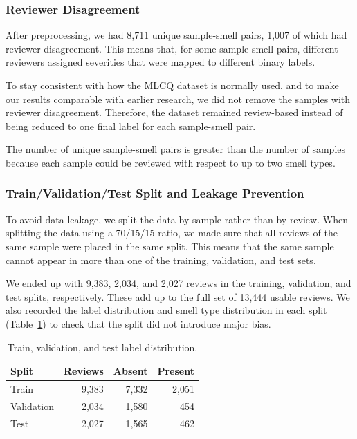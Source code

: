 \subsubsection{Reviewer Disagreement}

After preprocessing, we had 8,711 unique sample-smell pairs, 1,007 of which had reviewer disagreement. This means that, for some sample-smell pairs, different reviewers assigned severities that were mapped to different binary labels.

To stay consistent with how the MLCQ dataset is normally used, and to make our results comparable with earlier research, we did not remove the samples with reviewer disagreement. Therefore, the dataset remained review-based instead of being reduced to one final label for each sample-smell pair.

The number of unique sample-smell pairs is greater than the number of samples because each sample could be reviewed with respect to up to two smell types.

\subsubsection{Train/Validation/Test Split and Leakage Prevention}

To avoid data leakage, we split the data by sample rather than by review. When splitting the data using a 70/15/15 ratio, we made sure that all reviews of the same sample were placed in the same split. This means that the same sample cannot appear in more than one of the training, validation, and test sets.

We ended up with 9,383, 2,034, and 2,027 reviews in the training, validation, and test splits, respectively. These add up to the full set of 13,444 usable reviews. We also recorded the label distribution and smell type distribution in each split (Table~\ref{tab:split-distribution}) to check that the split did not introduce major bias.

\begin{table}[t]
\caption{Train, validation, and test label distribution.}
\label{tab:split-distribution}
\centering
\begin{tabular}{lrrr}
\hline
Split & Reviews & Absent & Present \\
\hline
Train & 9,383 & 7,332 & 2,051 \\
Validation & 2,034 & 1,580 & 454 \\
Test & 2,027 & 1,565 & 462 \\
\hline
\end{tabular}
\end{table}

